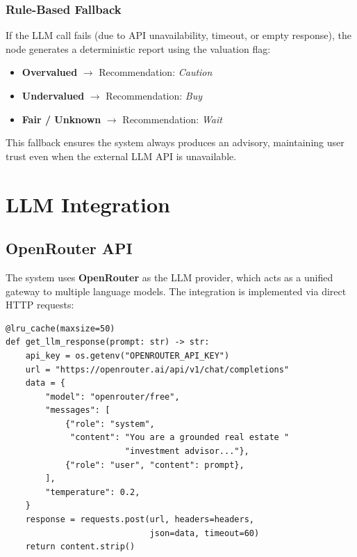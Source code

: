 \documentclass[11pt,a4paper]{article}
\begin{document}
\subsubsection{Rule-Based Fallback}

If the LLM call fails (due to API unavailability, timeout, or empty response), the node generates a deterministic report using the valuation flag:

\begin{itemize}[leftmargin=*]
    \item \textbf{Overvalued} $\rightarrow$ Recommendation: \textit{Caution}
    \item \textbf{Undervalued} $\rightarrow$ Recommendation: \textit{Buy}
    \item \textbf{Fair / Unknown} $\rightarrow$ Recommendation: \textit{Wait}
\end{itemize}

This fallback ensures the system always produces an advisory, maintaining user trust even when the external LLM API is unavailable.

\section{LLM Integration}

\subsection{OpenRouter API}

The system uses \textbf{OpenRouter} as the LLM provider, which acts as a unified gateway to multiple language models.
The integration is implemented via direct HTTP requests:

\begin{lstlisting}[caption={LLM integration (\texttt{src/agent/llm.py}).}]
@lru_cache(maxsize=50)
def get_llm_response(prompt: str) -> str:
    api_key = os.getenv("OPENROUTER_API_KEY")
    url = "https://openrouter.ai/api/v1/chat/completions"
    data = {
        "model": "openrouter/free",
        "messages": [
            {"role": "system",
             "content": "You are a grounded real estate "
                        "investment advisor..."},
            {"role": "user", "content": prompt},
        ],
        "temperature": 0.2,
    }
    response = requests.post(url, headers=headers,
                             json=data, timeout=60)
    return content.strip()
\end{lstlisting}
\end{document}
